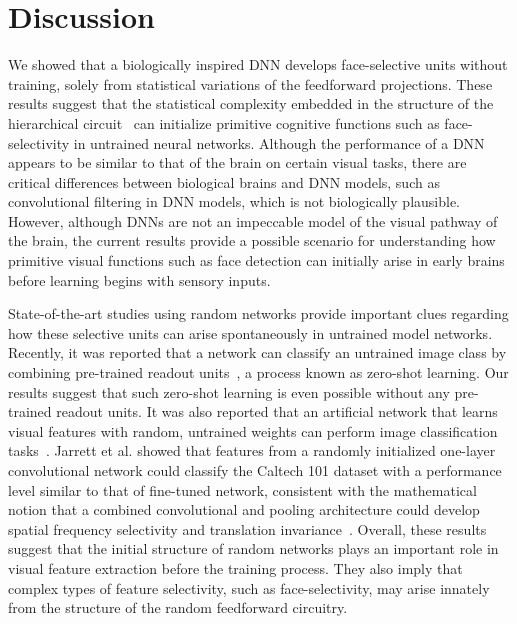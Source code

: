 \documentclass[sn-mathphys]{sn-jnl}%
\theoremstyle{thmstyleone}%
\theoremstyle{thmstyletwo}%
\theoremstyle{thmstylethree}%
\begin{document}
\section{Discussion}\label{sec12}

We showed that a biologically inspired DNN develops face-selective units without training, solely from statistical variations of the feedforward projections.
These results suggest that the statistical complexity embedded in the structure of the hierarchical circuit~\cite{paik2011retinal,jang2017interlayer,sailamul2017synaptic} can initialize primitive cognitive functions such as face-selectivity in untrained neural networks.
Although the performance of a DNN appears to be similar to that of the brain on certain visual tasks, 
there are critical differences between biological brains and DNN models, such as convolutional filtering in DNN models, which is not biologically plausible.
However, although DNNs are not an impeccable model of the visual pathway of the brain, 
the current results provide a possible scenario for understanding how primitive visual functions such as face detection can initially arise in early brains before learning begins with sensory inputs.


State-of-the-art studies using random networks provide important clues regarding how these selective units can arise spontaneously in untrained model networks.
Recently, it was reported that a network can classify an untrained image class by combining pre-trained readout units~\cite{socher2013zero}, a process known as zero-shot learning.
Our results suggest that such zero-shot learning is even possible without any pre-trained readout units.
It was also reported that an artificial network that learns visual features with random, untrained weights can perform image classification tasks~\cite{jarrett2009best,pinto2009high}.
Jarrett et al. showed that features from a randomly initialized one-layer convolutional network could classify the Caltech 101 dataset with a performance level similar to that of fine-tuned network, 
consistent with the mathematical notion that a combined convolutional and pooling architecture could develop spatial frequency selectivity and translation invariance~\cite{saxe2011random}.
Overall, these results suggest that the initial structure of random networks plays an important role in visual feature extraction before the training process.
They also imply that complex types of feature selectivity, such as face-selectivity, may arise innately from the structure of the random feedforward circuitry.
\end{document}
